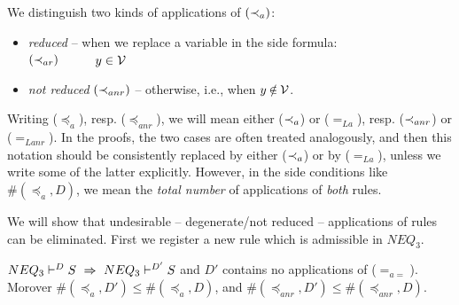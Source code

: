 \begin{DEFINITION}
\begin{itemize}
\end{itemize}
We distinguish two kinds of applications of $(\mathbin{\prec}_a)$:
\begin{itemize}\MyLPar
\item  {\em reduced} -- when we replace a variable in the side formula:\\
 $(\mathbin{\prec}_{ar})$\ \ 
\label{ru:ar}\ \ \  $y\in {\cal V}$
\item {\em not reduced} $(\mathbin{\prec}_{anr})$ -- otherwise, i.e.,  when
$y\not\in\Vars$. 
\end{itemize}
\end{DEFINITION}
\begin{REMARK}\label{re:notation}
Writing ($\preceq_a$), resp. ($\preceq_{anr}$), we will mean 
either ($\mathbin{\prec}_a$) or ($=_{La}$), resp. ($\mathbin{\prec}_{anr}$) or ($=_{Lanr}$).
In the proofs, the
 two cases are often treated analogously, and then this notation should be
 consistently replaced by either ($\mathbin{\prec}_a$) or by ($=_{La}$), unless we
 write some of the latter explicitly. 
However, in the side conditions like $\#(\preceq_a,D)$, we mean the {\em total number}
of applications of {\em both} rules.
\end{REMARK}
\noindent
We will show that undesirable -- degenerate/not reduced -- applications of rules
can be eliminated.
First we register a new rule which is admissible in $NEQ_3$.
%
\begin{LEMMA}\label{le:noeqeq}
 ${NEQ_3}\vdash^{{D}}S\ \mathrel\Rightarrow\ {NEQ_3}\vdash^{{D'}}S$ and $D'$ contains no applications
 of ($=_{a=}$). Morover $\#(\preceq_a,D')\leq \#(\preceq_a,D)$,
and $\#(\preceq_{anr},D')\leq \#(\preceq_{anr},D)$.
\end{LEMMA}
